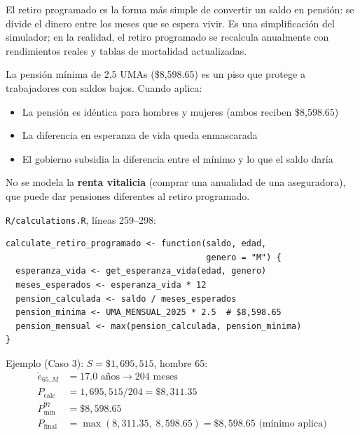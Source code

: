 \documentclass[11pt,a4paper]{report}
\theoremstyle{remark}
\begin{document}
\begin{tcolorbox}[colback=green!5!white, colframe=green!50!black, title=\textbf{Intuici\'on}]
El retiro programado es la forma m\'as simple de convertir un saldo en pensi\'on: se divide el dinero entre los meses que se espera vivir. Es una simplificaci\'on del simulador; en la realidad, el retiro programado se recalcula anualmente con rendimientos reales y tablas de mortalidad actualizadas.

La pensi\'on m\'inima de 2.5 UMAs (\$8,598.65) es un piso que protege a trabajadores con saldos bajos. Cuando aplica:
\begin{itemize}
  \item La pensi\'on es id\'entica para hombres y mujeres (ambos reciben \$8,598.65)
  \item La diferencia en esperanza de vida queda enmascarada
  \item El gobierno subsidia la diferencia entre el m\'inimo y lo que el saldo dar\'ia
\end{itemize}

No se modela la \textbf{renta vitalicia} (comprar una anualidad de una aseguradora), que puede dar pensiones diferentes al retiro programado.
\end{tcolorbox}

\begin{tcolorbox}[colback=orange!5!white, colframe=orange!75!black, title=\textbf{Aplicaci\'on en C\'odigo}]
\texttt{R/calculations.R}, l\'ineas 259--298:
\begin{lstlisting}
calculate_retiro_programado <- function(saldo, edad,
                                        genero = "M") {
  esperanza_vida <- get_esperanza_vida(edad, genero)
  meses_esperados <- esperanza_vida * 12
  pension_calculada <- saldo / meses_esperados
  pension_minima <- UMA_MENSUAL_2025 * 2.5  # $8,598.65
  pension_mensual <- max(pension_calculada, pension_minima)
}
\end{lstlisting}

Ejemplo (Caso 3): $S = \$1{,}695{,}515$, hombre 65:
\begin{align*}
\mathring{e}_{65,M} &= 17.0 \text{ a\~nos} \to 204 \text{ meses} \\
P_{\text{calc}} &= 1{,}695{,}515 / 204 = \$8{,}311.35 \\
P_{\min}^{97} &= \$8{,}598.65 \\
P_{\text{final}} &= \max(8{,}311.35, \; 8{,}598.65) = \$8{,}598.65 \text{ (m\'inimo aplica)}
\end{align*}
\end{tcolorbox}
\end{document}
